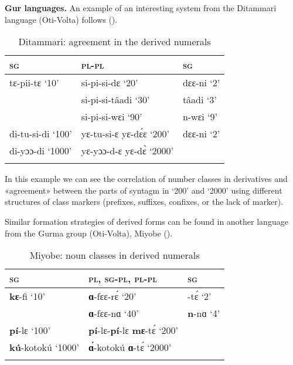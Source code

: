 \textbf{Gur languages.}  An example of an interesting system from the Ditammari language (Oti-Volta) follows ().


\begin{table}
\caption{\label{tab:1:16} Ditammari: agreement in the derived numerals}

\begin{tabularx}{.8\textwidth}{XXl}
\lsptoprule

\textsc{sg} & \textsc{pl}-\textsc{pl} & \textsc{sg}\\
\midrule
tɛ-pii-tɛ ‘10’ & si-pi-si-dɛ ‘20’ & dɛɛ-ni ‘2’\\
& si-pi-si-tâadi ‘30’ & tâadi ‘3’\\
& si-pi-si-wɛi ‘90’ & n-wɛi ‘9’\\
di-tu-si-di ‘100’ & yɛ-tu-si-ɛ  yɛ-d{\'{ɛ}}ɛ ‘200’ & dɛɛ-ni ‘2’\\
di-yɔɔ-di ‘1000’ & yɛ-yɔɔ-d-ɛ yɛ-d{\`{ɛ}} ‘2000’ & \\
\lspbottomrule
\end{tabularx}
\end{table}


In this example we can see the correlation of number classes in derivatives and «agreement» between the parts of syntagm in ‘200’ and ‘2000’ using different structures of class markers (prefixes, suffixes, confixes, or the lack of marker). 

Similar formation strategies of derived forms can be found in another language from the Gurma group (Oti-Volta), Miyobe ().


\begin{table}
\caption{\label{tab:1:17} Miyobe: noun classes in derived numerals}

\begin{tabularx}{.8\textwidth}{XXl}
\lsptoprule

\textsc{sg} & \textsc{pl}, \textsc{sg}-\textsc{pl}, \textsc{pl}-\textsc{pl} & \textsc{sg}\\
\midrule
\textbf{kɛ}-fi ‘10’ & \textbf{ɑ}-fɛɛ-r{\'{ɛ}} ‘20’ & -t{\'{ɛ}} ‘2’\\
& \textbf{ɑ}-fɛɛ-nɑ ‘40’ & \textbf{n}-nɑ ‘4’\\
\textbf{pí}-lɛ ‘100’ & \textbf{pí}-lɛ-\textbf{pí}-lɛ \textbf{mɛ}-t{\'{ɛ}} ‘200’ & \\
\textbf{kú}-kotokú ‘1000’ & \textbf{{\'{ɑ}}}-kotokú \textbf{ɑ}-t{\'{ɛ}} ‘2000’ & \\
\lspbottomrule
\end{tabularx}
\end{table}


